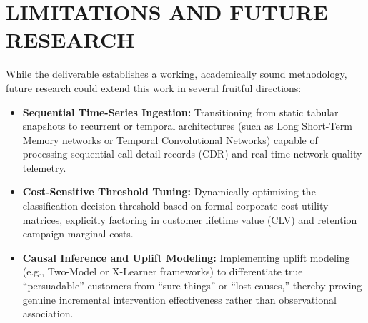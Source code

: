 \section{LIMITATIONS AND FUTURE RESEARCH}
While the deliverable establishes a working, academically sound methodology, future research could extend this work in several fruitful directions:
\begin{itemize}
    \item \textbf{Sequential Time-Series Ingestion:} Transitioning from static tabular snapshots to recurrent or temporal architectures (such as Long Short-Term Memory networks or Temporal Convolutional Networks) capable of processing sequential call-detail records (CDR) and real-time network quality telemetry.
    \item \textbf{Cost-Sensitive Threshold Tuning:} Dynamically optimizing the classification decision threshold based on formal corporate cost-utility matrices, explicitly factoring in customer lifetime value (CLV) and retention campaign marginal costs.
    \item \textbf{Causal Inference and Uplift Modeling:} Implementing uplift modeling (e.g., Two-Model or X-Learner frameworks) to differentiate true ``persuadable'' customers from ``sure things'' or ``lost causes,'' thereby proving genuine incremental intervention effectiveness rather than observational association.
\end{itemize}
